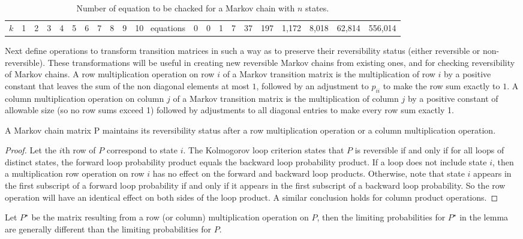 \documentclass[12pt]{article}
\begin{document}
\begin{table}
  \centering
  \begin{tabular}{ccccccccccc}
    $k$& 1&2 &3 &4 &5 &6 & 7 & 8 & 9 & 10 \
    equations & 0 & 0 & 1 & 7 & 37 & 197 & 1{,}172 & 8{,}018 & 62{,}814 & 556{,}014
  \end{tabular}
  \caption{Number of equation to be chacked for a Markov chain with
    $n$ states.}
  \label{tab:reversiblemarkovchains:loopeqns}
\end{table}

Next define operations to transform transition matrices in such a way as to
preserve their reversibility status (either reversible or
non-reversible). These
transformations will be useful in creating new reversible Markov chains from existing
ones, and for checking reversibility of Markov chains.
A row multiplication operation on row $i$ of a Markov transition
matrix is the multiplication of row $i$ by a positive constant that leaves the sum
of the non diagonal elements at most $1$, followed by an adjustment to $p_{ii}$ to make
the row sum exactly to $1$.
A column multiplication operation on column $j$ of a Markov transition matrix is the multiplication of column $j$ by a positive constant of allowable
size (so no row sums exceed 1) followed by adjustments to all diagonal entries to
make every row sum exactly 1.

\begin{lemma}
  A Markov chain matrix P maintains its reversibility status after
a row multiplication operation or a column multiplication operation.
\end{lemma}

\begin{proof}
  Let the $i$th row of $P$ correspond to state $i$. The Kolmogorov
  loop criterion states
that $P$ is reversible if and only if for all loops of distinct states, the forward loop probability
product equals the backward loop probability product. If a loop does not include
state $i$, then a multiplication row operation on row $i$ has no effect on
the forward
and backward loop products. Otherwise, note that state $i$ appears in the first
subscript of a forward loop probability if and only if it appears in the first subscript of a
backward loop probability. So the row operation will have an identical effect on
both sides of the loop product. A similar conclusion holds for column product
operations.
\end{proof}

\begin{remark}
  Let $P^{\star}$ be the matrix resulting from a row (or column) multiplication operation on $P$, then the limiting probabilities for $P^{\star}$ in the lemma
are generally different than the limiting probabilities for $P$. 
\end{remark}
\end{document}
